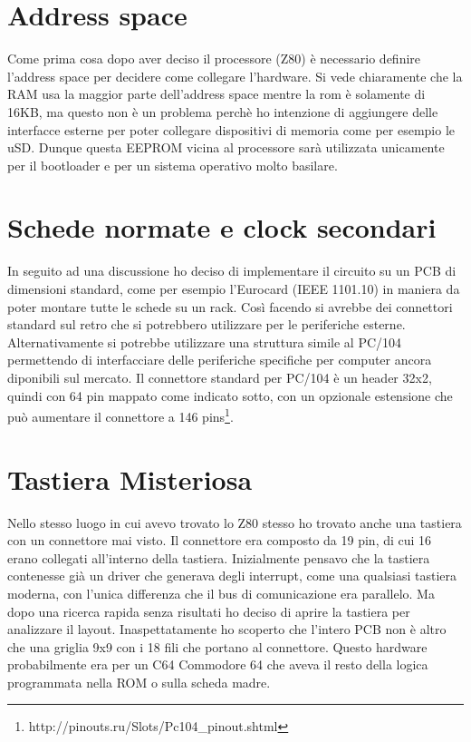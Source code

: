 \documentclass[final, ms, a4paper, 11pt]{memoir}
\newcommand\ddate{01.01.1970}
\begin{document}
\renewcommand\ddate{13.02.2017}
\section{Address space}
Come prima cosa dopo aver deciso il processore (Z80) \`e necessario definire
l'address space per decidere come collegare l'hardware. Si vede chiaramente che
la RAM usa la maggior parte dell'address space mentre la rom \`e solamente di
16KB, ma questo non \`e un problema perch\`e ho intenzione di aggiungere delle
interfacce esterne per poter collegare dispositivi di memoria come per esempio
le uSD. Dunque questa EEPROM vicina al processore sar\`a utilizzata unicamente
per il bootloader e per un sistema operativo molto basilare.


\renewcommand\ddate{06.03.2017}
\section{Schede normate e clock secondari}
In seguito ad una discussione ho deciso di implementare il circuito su un PCB di
dimensioni standard, come per esempio l'Eurocard (IEEE 1101.10) in maniera da
poter montare tutte le schede su un rack. Cos\`i facendo si avrebbe dei
connettori standard sul retro che si potrebbero utilizzare per le periferiche
esterne. Alternativamente si potrebbe utilizzare una struttura simile al PC/104
permettendo di interfacciare delle periferiche specifiche per computer ancora
diponibili sul mercato. Il connettore standard per PC/104 \`e un header 32x2,
quindi con 64 pin mappato come indicato sotto, con un opzionale estensione che
pu\`o aumentare il connettore a 146
pins\footnote{http://pinouts.ru/Slots/Pc104\_pinout.shtml}.


\renewcommand\ddate{07.03.2017}
\section{Tastiera Misteriosa}
Nello stesso luogo in cui avevo trovato lo Z80 stesso ho trovato anche una
tastiera con un connettore mai visto. Il connettore era composto da 19 pin, di
cui 16 erano collegati all'interno della tastiera. Inizialmente pensavo che la
tastiera contenesse gi\`a un driver che generava degli interrupt, come una
qualsiasi tastiera moderna, con l'unica differenza che il bus di comunicazione
era parallelo. Ma dopo una ricerca rapida senza risultati ho deciso di aprire la
tastiera per analizzare il layout. Inaspettatamente ho scoperto che l'intero PCB
non \`e altro che una griglia 9x9 con i 18 fili che portano al connettore.
Questo hardware probabilmente era per un C64 Commodore 64 che aveva il resto
della logica programmata nella ROM o sulla scheda madre.
\end{document}
